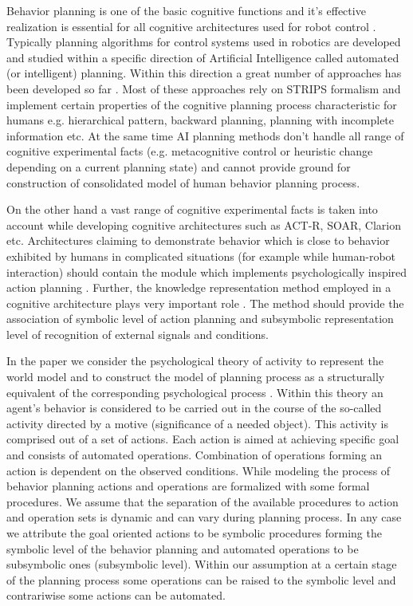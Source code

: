 \documentclass[procedia]{easychair}
\begin{document}
Behavior planning is one of the basic cognitive functions and it's effective realization is essential for all cognitive architectures used for robot control \cite{Emelyanov2016,Hanford2011,Trafton2013}. Typically planning algorithms for control systems used in robotics are developed and studied within a specific direction of Artificial Intelligence called automated (or intelligent) planning. Within this direction a great number of approaches has been developed so far \cite{DellaPenna2012,Richter2010,Hoffmann2001}. Most of these approaches rely on STRIPS formalism \cite{Fikes1971} and implement certain properties of the cognitive planning process characteristic for humans e.g. hierarchical pattern, backward planning, planning with incomplete information etc. At the same time AI planning methods don't handle all range of cognitive experimental facts (e.g. metacognitive control or heuristic change depending on a current planning state) and cannot provide ground for construction of consolidated model of human behavior planning process.

On the other hand a vast range of cognitive experimental facts is taken into account while developing cognitive architectures such as ACT-R, SOAR, Clarion etc. Architectures claiming to demonstrate behavior which is close to behavior exhibited by humans in complicated situations (for example while human-robot interaction) should contain the module which implements psychologically inspired action planning \cite{Sun2012a}. Further, the knowledge representation method employed in a cognitive architecture plays very important role \cite{Lieto2014}. The method should provide the association of symbolic level of action planning and subsymbolic representation level of recognition of external signals and conditions.

In the paper we consider the psychological theory of activity \cite{Leontyev2009} to represent the world model and to construct the model of planning process as a structurally equivalent of the corresponding psychological process \cite{Lieto2016}. Within this theory an agent's behavior is considered to be carried out in the course of the so-called activity directed by a motive (significance of a needed object). This activity is comprised out of a set of actions. Each action is aimed at achieving specific goal and consists of automated operations. Combination of operations forming an action is dependent on the observed conditions. While modeling the process of behavior planning actions and operations are formalized with some formal procedures. We assume that the separation of the available procedures to action and operation sets is dynamic and can vary during planning process. In any case we attribute the goal oriented actions to be symbolic procedures forming the symbolic level of the behavior planning and automated operations to be subsymbolic ones (subsymbolic level). Within our assumption at a certain stage of the planning process some operations can be raised to the symbolic level and contrariwise some actions can be automated.
\end{document}
